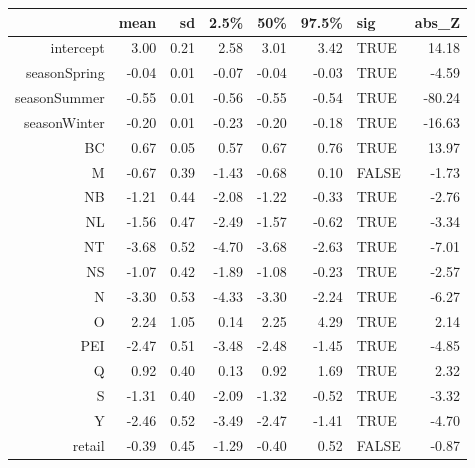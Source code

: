 \begin{table}[ht]
\centering
\begin{tabular}{rrrrrrlr}
  \hline
 & mean & sd & 2.5\% & 50\% & 97.5\% & sig & abs\_Z \\ 
  \hline
intercept & 3.00 & 0.21 & 2.58 & 3.01 & 3.42 & TRUE & 14.18 \\ 
  seasonSpring & -0.04 & 0.01 & -0.07 & -0.04 & -0.03 & TRUE & -4.59 \\ 
  seasonSummer & -0.55 & 0.01 & -0.56 & -0.55 & -0.54 & TRUE & -80.24 \\ 
  seasonWinter & -0.20 & 0.01 & -0.23 & -0.20 & -0.18 & TRUE & -16.63 \\ 
  BC & 0.67 & 0.05 & 0.57 & 0.67 & 0.76 & TRUE & 13.97 \\ 
  M & -0.67 & 0.39 & -1.43 & -0.68 & 0.10 & FALSE & -1.73 \\ 
  NB & -1.21 & 0.44 & -2.08 & -1.22 & -0.33 & TRUE & -2.76 \\ 
  NL & -1.56 & 0.47 & -2.49 & -1.57 & -0.62 & TRUE & -3.34 \\ 
  NT & -3.68 & 0.52 & -4.70 & -3.68 & -2.63 & TRUE & -7.01 \\ 
  NS & -1.07 & 0.42 & -1.89 & -1.08 & -0.23 & TRUE & -2.57 \\ 
  N & -3.30 & 0.53 & -4.33 & -3.30 & -2.24 & TRUE & -6.27 \\ 
  O & 2.24 & 1.05 & 0.14 & 2.25 & 4.29 & TRUE & 2.14 \\ 
  PEI & -2.47 & 0.51 & -3.48 & -2.48 & -1.45 & TRUE & -4.85 \\ 
  Q & 0.92 & 0.40 & 0.13 & 0.92 & 1.69 & TRUE & 2.32 \\ 
  S & -1.31 & 0.40 & -2.09 & -1.32 & -0.52 & TRUE & -3.32 \\ 
  Y & -2.46 & 0.52 & -3.49 & -2.47 & -1.41 & TRUE & -4.70 \\ 
  retail & -0.39 & 0.45 & -1.29 & -0.40 & 0.52 & FALSE & -0.87 \\ 
   \hline
\end{tabular}
\end{table}
